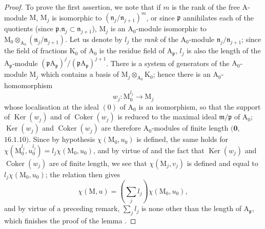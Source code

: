 \begin{proof}
To prove the first assertion, we note that if $m$ is the rank of the free A-module $\mathrm{M}$, $\mathrm{M}_j$ is isomorphic to $(\mathfrak{n}_j/\mathfrak{n}_{j+1})^m$, or since $\mathfrak{p}$ annihilates each of the quotients (since $\mathfrak{p}.\mathfrak{n}_j\subset\mathfrak{n}_{j+1}$), $\mathrm{M}_j$ is an $\mathrm{A}_0$-module isomorphic to $\mathrm{M}_0\otimes_{\mathrm{A}_0}(\mathfrak{n}_j/\mathfrak{n}_{j+1})$.
Let us denote by $l_j$ the \emph{rank} of the $\mathrm{A}_0$-module $\mathfrak{n}_j/\mathfrak{n}_{j+1}$; since the field of fractions $\mathrm{K}_0$ of $\mathrm{A}_0$ is the residue field of $\mathrm{A}_{\mathfrak{p}}$, $l_j$ is also the length of the $\mathrm{A}_{\mathfrak{p}}$-module $(\mathfrak{p}\mathrm{A}_{\mathfrak{p}})^j/(\mathfrak{p}\mathrm{A}_{\mathfrak{p}})^{j+1}$.
There is a system of generators of the $\mathrm{A}_0$-module $\mathrm{M}_j$ which contains a basis of $\mathrm{M}_j\otimes_{\mathrm{A}_0}\mathrm{K}_0$; hence there is an $\mathrm{A}_0$-homomorphism
\[
  w_j:\mathrm{M}_0^{l_j}\to\mathrm{M}_j
\]
whose localisation at the ideal $(0)$ of $\mathrm{A}_0$ is an isomorphism, so that the support of $\operatorname{Ker}(w_j)$ and of $\operatorname{Coker}(w_j)$ is reduced to the maximal ideal $\mathfrak{m}/\mathfrak{p}$ of $\mathrm{A}_0$; $\operatorname{Ker}(w_j)$ and $\operatorname{Coker}(w_j)$ are therefore $\mathrm{A}_0$-modules of finite length $(\mathbf{0}$, $16.1.10)$.
Since by hypothesis $\chi(\mathrm{M}_0,u_0)$ is defined, the same holds for $\chi(\mathrm{M}_0^{l_j},u_0^{l_j})=l_j\chi(\mathrm{M}_0,u_0)$, and by virtue of  and the fact that $\operatorname{Ker}(w_j)$ and $\operatorname{Coker}(w_j)$ are of finite length, we see that $\chi(\mathrm{M}_j,v_j)$ is defined and equal to $l_j\chi(\mathrm{M}_0,u_0)$; the relation  then gives
\[
  \chi(\mathrm{M},u)=(\sum_j l_j)\chi(\mathrm{M}_0,u_0),
\]
and by virtue of a preceding remark, $\sum_j l_j$ is none other than the length of $\mathrm{A}_{\mathfrak{p}}$, which finishes the proof of the lemma .
\end{proof}

